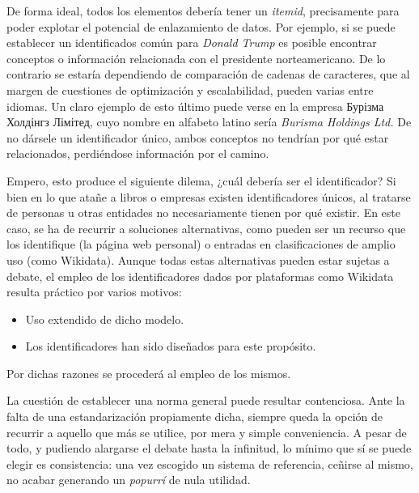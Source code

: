 \documentclass{report}
\begin{document}
De forma ideal, todos los elementos debería tener un \textit{itemid}, precisamente para poder explotar el potencial de enlazamiento de datos.
Por ejemplo, si se puede establecer un identificados común para \textit{Donald Trump} es posible encontrar conceptos o información relacionada con el presidente norteamericano.
De lo contrario se estaría dependiendo de comparación de cadenas de caracteres, que al margen de cuestiones de optimización y escalabilidad, pueden varias entre idiomas.
Un claro ejemplo de esto último puede verse en la empresa Бурізма Холдінгз Лімітед, cuyo nombre en alfabeto latino sería \textit{Burisma Holdings Ltd.}
De no dársele un identificador único, ambos conceptos no tendrían por qué estar relacionados, perdiéndose información por el camino.

Empero, esto produce el siguiente dilema, ¿cuál debería ser el identificador?
Si bien en lo que atañe a libros o empresas existen identificadores únicos, al tratarse de personas u otras entidades no necesariamente tienen por qué existir.
En este caso, se ha de recurrir a soluciones alternativas, como pueden ser un recurso que los identifique (la página web personal) o entradas en clasificaciones de amplio uso (como Wikidata).
Aunque todas estas alternativas pueden estar sujetas a debate, el empleo de los identificadores dados por plataformas como Wikidata resulta práctico por varios motivos:
\begin{itemize}
\item Uso extendido de dicho modelo.
\item Los identificadores han sido diseñados para este propósito.
\end{itemize}

Por dichas razones se procederá al empleo de los mismos.

La cuestión de establecer una norma general puede resultar contenciosa.
Ante la falta de una estandarización propiamente dicha, siempre queda la opción de recurrir a aquello que más se utilice, por mera y simple conveniencia.
A pesar de todo, y pudiendo alargarse el debate hasta la infinitud, lo mínimo que sí se puede elegir es consistencia: una vez escogido un sistema de referencia, ceñirse al mismo, no acabar generando un \textit{popurrí} de nula utilidad.
\end{document}
